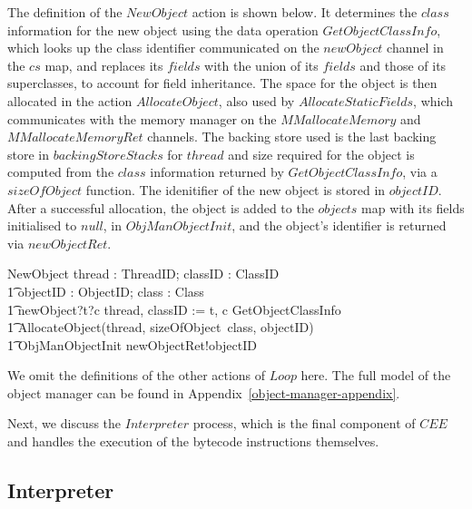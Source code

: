 The definition of the $NewObject$ action is shown below.
It determines the $class$ information for the new object using the
data operation $GetObjectClassInfo$, which looks up the class
identifier communicated on the $newObject$ channel in the $cs$ map,
and replaces its $fields$ with the union of its $fields$ and those of
its superclasses, to account for field inheritance.
The space for the object is then allocated in the action
$AllocateObject$, also used by $AllocateStaticFields$, which
communicates with the memory manager on the $MMallocateMemory$ and
$MMallocateMemoryRet$ channels.
The backing store used is the last backing store in
$backingStoreStacks$ for $thread$ and size required for the object is
computed from the $class$ information returned by
$GetObjectClassInfo$, via a $sizeOfObject$ function.
The idenitifier of the new object is stored in $objectID$.
After a successful allocation, the object is added to the $objects$
map with its fields initialised to $null$, in $ObjManObjectInit$, and
the object's identifier is returned via $newObjectRet$.
\begin{circusaction}
  NewObject \circdef \circvar thread : ThreadID; classID : ClassID \circspot \\
  \t1 \circvar objectID : ObjectID; class : Class \circspot \\
  \t1 newObject?t?c \then thread, classID := t, c \circseq \lschexpract GetObjectClassInfo \rschexpract \circseq \\
  \t1 AllocateObject(thread, sizeOfObject~class, objectID) \circseq \\
  \t1 \lschexpract ObjManObjectInit \rschexpract \circseq newObjectRet!objectID \then \Skip
\end{circusaction}

We omit the definitions of the other actions of $Loop$ here. 
The full model of the object manager can be found in
Appendix~\ref{object-manager-appendix}.

Next, we discuss the $Interpreter$ process, which is the final
component of $CEE$ and handles the execution of the bytecode
instructions themselves.

\subsection{Interpreter}
\label{cee-interpreter-subsection}

